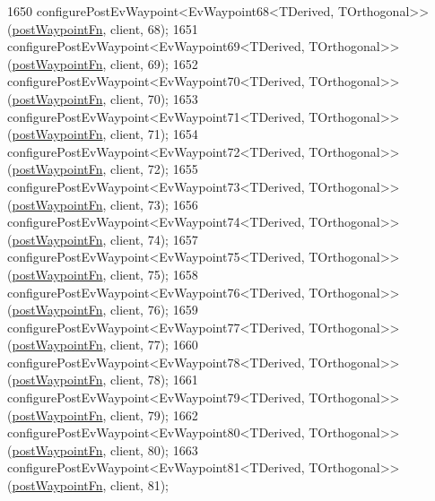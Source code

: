 \begin{DoxyCode}
1650     configurePostEvWaypoint<EvWaypoint68<TDerived, TOrthogonal>>(\hyperlink{classcl__move__base__z_1_1WaypointEventDispatcher_a964a57fcce5d48ec60243230722d8dd7}{postWaypointFn}, client, 68);
1651     configurePostEvWaypoint<EvWaypoint69<TDerived, TOrthogonal>>(\hyperlink{classcl__move__base__z_1_1WaypointEventDispatcher_a964a57fcce5d48ec60243230722d8dd7}{postWaypointFn}, client, 69);
1652     configurePostEvWaypoint<EvWaypoint70<TDerived, TOrthogonal>>(\hyperlink{classcl__move__base__z_1_1WaypointEventDispatcher_a964a57fcce5d48ec60243230722d8dd7}{postWaypointFn}, client, 70);
1653     configurePostEvWaypoint<EvWaypoint71<TDerived, TOrthogonal>>(\hyperlink{classcl__move__base__z_1_1WaypointEventDispatcher_a964a57fcce5d48ec60243230722d8dd7}{postWaypointFn}, client, 71);
1654     configurePostEvWaypoint<EvWaypoint72<TDerived, TOrthogonal>>(\hyperlink{classcl__move__base__z_1_1WaypointEventDispatcher_a964a57fcce5d48ec60243230722d8dd7}{postWaypointFn}, client, 72);
1655     configurePostEvWaypoint<EvWaypoint73<TDerived, TOrthogonal>>(\hyperlink{classcl__move__base__z_1_1WaypointEventDispatcher_a964a57fcce5d48ec60243230722d8dd7}{postWaypointFn}, client, 73);
1656     configurePostEvWaypoint<EvWaypoint74<TDerived, TOrthogonal>>(\hyperlink{classcl__move__base__z_1_1WaypointEventDispatcher_a964a57fcce5d48ec60243230722d8dd7}{postWaypointFn}, client, 74);
1657     configurePostEvWaypoint<EvWaypoint75<TDerived, TOrthogonal>>(\hyperlink{classcl__move__base__z_1_1WaypointEventDispatcher_a964a57fcce5d48ec60243230722d8dd7}{postWaypointFn}, client, 75);
1658     configurePostEvWaypoint<EvWaypoint76<TDerived, TOrthogonal>>(\hyperlink{classcl__move__base__z_1_1WaypointEventDispatcher_a964a57fcce5d48ec60243230722d8dd7}{postWaypointFn}, client, 76);
1659     configurePostEvWaypoint<EvWaypoint77<TDerived, TOrthogonal>>(\hyperlink{classcl__move__base__z_1_1WaypointEventDispatcher_a964a57fcce5d48ec60243230722d8dd7}{postWaypointFn}, client, 77);
1660     configurePostEvWaypoint<EvWaypoint78<TDerived, TOrthogonal>>(\hyperlink{classcl__move__base__z_1_1WaypointEventDispatcher_a964a57fcce5d48ec60243230722d8dd7}{postWaypointFn}, client, 78);
1661     configurePostEvWaypoint<EvWaypoint79<TDerived, TOrthogonal>>(\hyperlink{classcl__move__base__z_1_1WaypointEventDispatcher_a964a57fcce5d48ec60243230722d8dd7}{postWaypointFn}, client, 79);
1662     configurePostEvWaypoint<EvWaypoint80<TDerived, TOrthogonal>>(\hyperlink{classcl__move__base__z_1_1WaypointEventDispatcher_a964a57fcce5d48ec60243230722d8dd7}{postWaypointFn}, client, 80);
1663     configurePostEvWaypoint<EvWaypoint81<TDerived, TOrthogonal>>(\hyperlink{classcl__move__base__z_1_1WaypointEventDispatcher_a964a57fcce5d48ec60243230722d8dd7}{postWaypointFn}, client, 81);

\end{DoxyCode}
